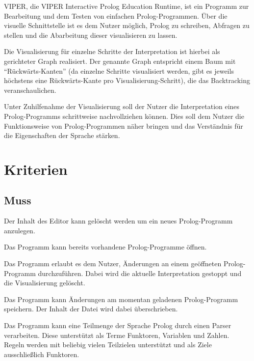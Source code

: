 \documentclass[parskip=full,11pt,twoside]{scrartcl}
\begin{document}
VIPER, die VIPER Interactive Prolog Education Runtime, ist ein Programm zur Bearbeitung und dem Testen von einfachen Prolog-Programmen. Über die visuelle Schnittstelle ist es dem Nutzer möglich, Prolog zu schreiben, Abfragen zu stellen und die Abarbeitung dieser visualisieren zu lassen.

Die Visualisierung für einzelne Schritte der Interpretation ist hierbei als gerichteter Graph realisiert. Der genannte Graph entspricht einem Baum mit \enquote{Rückwärts-Kanten} (da einzelne Schritte visualisiert werden, gibt es jeweils höchstens eine Rückwärts-Kante pro Visualisierung-Schritt), die das Backtracking veranschaulichen.

Unter Zuhilfenahme der Visualisierung soll der Nutzer die Interpretation eines Prolog-Programms schrittweise nachvollziehen können. Dies soll dem Nutzer die Funktionsweise von Prolog-Programmen näher bringen und das Verständnis für die Eigenschaften der Sprache stärken.

\section{Kriterien}

\subsection{Muss}


Der Inhalt des Editor kann gelöscht werden um ein neues Prolog-Programm anzulegen.


Das Programm kann bereits vorhandene Prolog-Programme öffnen.


Das Programm erlaubt es dem Nutzer, Änderungen an einem geöffneten Prolog-Programm durchzuführen. Dabei wird die aktuelle Interpretation gestoppt und die Visualisierung gelöscht.


Das Programm kann Änderungen am momentan geladenen Prolog-Programm speichern. Der Inhalt der Datei wird dabei überschrieben.


Das Programm kann eine Teilmenge der Sprache Prolog durch einen Parser verarbeiten. Diese unterstützt als Terme Funktoren, Variablen und Zahlen. Regeln werden mit beliebig vielen Teilzielen unterstützt und als Ziele ausschließlich Funktoren.
\end{document}
